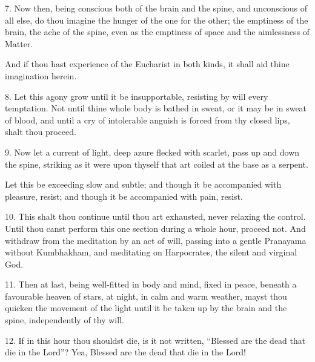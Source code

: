 7. Now then, being conscious both of the brain and the spine, and unconscious of all else, do thou imagine the hunger of the one for the other; the emptiness of the brain, the ache of the spine, even as the emptiness of space and the aimlessness of Matter.

And if thou hast experience of the Eucharist in both kinds, it shall aid thine imagination herein.

8. Let this agony grow until it be insupportable, resisting by will every temptation. Not until thine whole body is bathed in sweat, or it may be in sweat of blood, and until a cry of intolerable anguish is forced from thy closed lips, shalt thou proceed.

9. Now let a current of light, deep azure flecked with scarlet, pass up and down the spine, striking as it were upon thyself that art coiled at the base as a serpent.

Let this be exceeding slow and subtle; and though it be accompanied with pleasure, resist; and though it be accompanied with pain, resist.

10. This shalt thou continue until thou art exhausted, never relaxing the control. Until thou canst perform this one section during a whole hour, proceed not. And withdraw from the meditation by an act of will, passing into a gentle Pranayama without Kumbhakham, and meditating on Harpocrates, the silent and virginal God.

11. Then at last, being well-fitted in body and mind, fixed in peace, beneath a favourable heaven of stars, at night, in calm and warm weather, mayst thou quicken the movement of the light until it be taken up by the brain and the spine, independently of thy will.

12. If in this hour thou shouldst die, is it not written, \enquote{Blessed are the dead that die in the Lord}? Yea, Blessed are the dead that die in the Lord!
